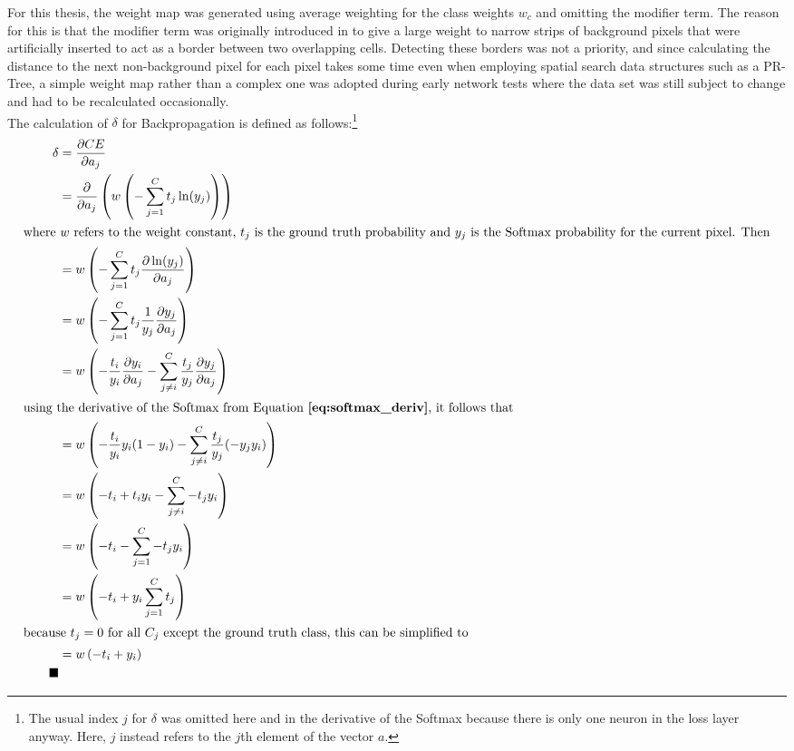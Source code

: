 For this thesis, the weight map was generated using average weighting for the class weights $w_c$ and omitting the modifier term. The reason for this is that the modifier term was originally introduced in \cite{unet} to give a large weight to narrow strips of background pixels that were artificially inserted to act as a border between two overlapping cells. Detecting these borders was not a priority, and since calculating the distance to the next non-background pixel for each pixel takes some time even when employing spatial search data structures such as a PR-Tree,  a simple weight map rather than a complex one was adopted during early network tests where the data set was still subject to change and had to be recalculated occasionally.\\

\noindent The calculation of $\delta$ for Backpropagation is defined as follows:\footnote{The usual index $j$ for $\delta$ was omitted here and in the derivative of the Softmax because there is only one neuron in the loss layer anyway. Here, $j$ instead refers to the $j$th element of the vector $a$.} \\


\begin {align}
	\delta &= \frac{\partial CE}{\partial a_j} \\
		&= \frac{\partial}{\partial a_j} \left ( w \left ( - \sum \limits_{j=1}^{C} t_j \ln(y_j) \right ) \right ) \\ \intertext{where $w$ refers to the weight constant, $t_j$ is the ground truth probability and $y_j$ is the Softmax probability for the current pixel. Then}
		&= w \left ( - \sum \limits_{j=1}^{C} t_j \frac{\partial \ln(y_j)}{\partial a_j} \right ) \\
		&= w \left (- \sum \limits_{j=1}^{C} t_j \frac{1}{y_j} \frac{\partial y_j}{\partial a_j} \right ) \\
		&= w \left ( - \frac{t_i}{y_i} \frac{\partial y_i}{\partial a_j} - \sum \limits_{j \neq i}^{C} \frac{t_j}{y_j} \frac{\partial y_j}{\partial a_j} \right ) \\ \intertext{using the derivative of the Softmax from Equation \textbf{\ref{eq:softmax_deriv}}, it follows that}
		&= w \left ( - \frac{t_i}{y_i} y_i (1 - y_i) - \sum \limits_{j \neq i}^{C} \frac{t_j}{y_j} (- y_j y_i) \right ) \\
		&= w \left ( - t_i + t_i y_i - \sum \limits_{j \neq i}^{C} - t_j y_i \right ) \\
		&= w \left ( - t_i - \sum \limits_{j=1}^{C} - t_j y_i  \right ) \\
		&= w \left ( - t_i + y_i \sum \limits_{j=1}^{C} t_j \right ) \\ \intertext{because $t_j = 0$ for all $C_j$ except the ground truth class, this can be simplified to} 
		&= w \left (- t_i + y_i \right ) \\ \tag*{$\blacksquare$} 
\end {align}

